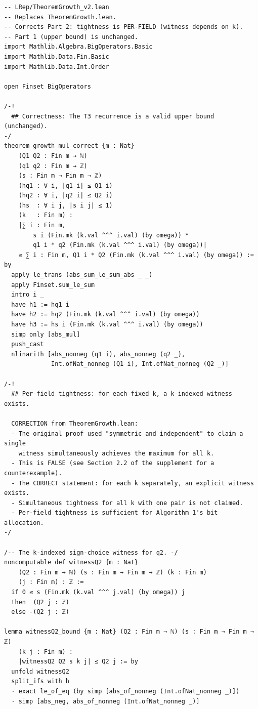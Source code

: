 \documentclass[11pt,a4paper]{article}
\theoremstyle{definition}
\theoremstyle{plain}
\theoremstyle{remark}
\begin{document}
\begin{leanblock}
\begin{lstlisting}[language={},
  caption={TheoremGrowth\_v2.lean: corrected per-field tightness.
  The witness is explicitly indexed by \texttt{k}.},
  label=lst:growth-v2]
-- LRep/TheoremGrowth_v2.lean
-- Replaces TheoremGrowth.lean.
-- Corrects Part 2: tightness is PER-FIELD (witness depends on k).
-- Part 1 (upper bound) is unchanged.
import Mathlib.Algebra.BigOperators.Basic
import Mathlib.Data.Fin.Basic
import Mathlib.Data.Int.Order

open Finset BigOperators

/-!
  ## Correctness: The T3 recurrence is a valid upper bound (unchanged).
-/
theorem growth_mul_correct {m : Nat}
    (Q1 Q2 : Fin m → ℕ)
    (q1 q2 : Fin m → ℤ)
    (s : Fin m → Fin m → ℤ)
    (hq1 : ∀ i, |q1 i| ≤ Q1 i)
    (hq2 : ∀ i, |q2 i| ≤ Q2 i)
    (hs  : ∀ i j, |s i j| ≤ 1)
    (k   : Fin m) :
    |∑ i : Fin m,
        s i (Fin.mk (k.val ^^^ i.val) (by omega)) *
        q1 i * q2 (Fin.mk (k.val ^^^ i.val) (by omega))|
    ≤ ∑ i : Fin m, Q1 i * Q2 (Fin.mk (k.val ^^^ i.val) (by omega)) := by
  apply le_trans (abs_sum_le_sum_abs _ _)
  apply Finset.sum_le_sum
  intro i _
  have h1 := hq1 i
  have h2 := hq2 (Fin.mk (k.val ^^^ i.val) (by omega))
  have h3 := hs i (Fin.mk (k.val ^^^ i.val) (by omega))
  simp only [abs_mul]
  push_cast
  nlinarith [abs_nonneg (q1 i), abs_nonneg (q2 _),
             Int.ofNat_nonneg (Q1 i), Int.ofNat_nonneg (Q2 _)]

/-!
  ## Per-field tightness: for each fixed k, a k-indexed witness exists.

  CORRECTION from TheoremGrowth.lean:
  - The original proof used "symmetric and independent" to claim a single
    witness simultaneously achieves the maximum for all k.
  - This is FALSE (see Section 2.2 of the supplement for a counterexample).
  - The CORRECT statement: for each k separately, an explicit witness exists.
  - Simultaneous tightness for all k with one pair is not claimed.
  - Per-field tightness is sufficient for Algorithm 1's bit allocation.
-/

/-- The k-indexed sign-choice witness for q2. -/
noncomputable def witnessQ2 {m : Nat}
    (Q2 : Fin m → ℕ) (s : Fin m → Fin m → ℤ) (k : Fin m)
    (j : Fin m) : ℤ :=
  if 0 ≤ s (Fin.mk (k.val ^^^ j.val) (by omega)) j
  then  (Q2 j : ℤ)
  else -(Q2 j : ℤ)

lemma witnessQ2_bound {m : Nat} (Q2 : Fin m → ℕ) (s : Fin m → Fin m → ℤ)
    (k j : Fin m) :
    |witnessQ2 Q2 s k j| ≤ Q2 j := by
  unfold witnessQ2
  split_ifs with h
  · exact le_of_eq (by simp [abs_of_nonneg (Int.ofNat_nonneg _)])
  · simp [abs_neg, abs_of_nonneg (Int.ofNat_nonneg _)]


\end{lstlisting}
\end{leanblock}
\end{document}
